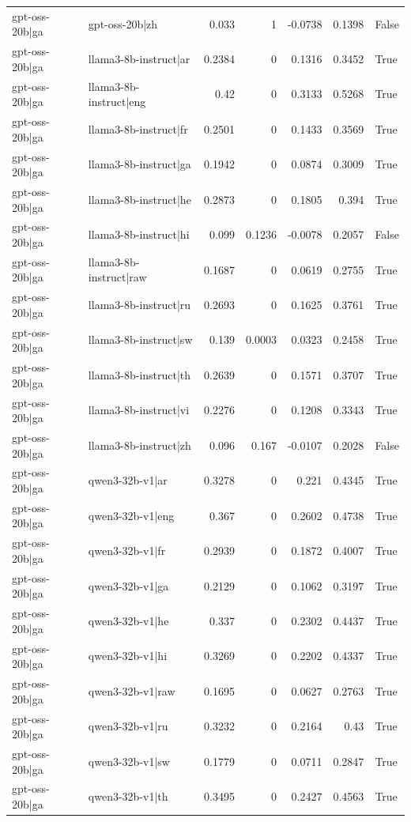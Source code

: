 \begin{table}
\begin{tabular}{l l r r r r l}
gpt-oss-20b|ga & gpt-oss-20b|zh & 0.033 & 1 & -0.0738 & 0.1398 & False \\
gpt-oss-20b|ga & llama3-8b-instruct|ar & 0.2384 & 0 & 0.1316 & 0.3452 & True \\
gpt-oss-20b|ga & llama3-8b-instruct|eng & 0.42 & 0 & 0.3133 & 0.5268 & True \\
gpt-oss-20b|ga & llama3-8b-instruct|fr & 0.2501 & 0 & 0.1433 & 0.3569 & True \\
gpt-oss-20b|ga & llama3-8b-instruct|ga & 0.1942 & 0 & 0.0874 & 0.3009 & True \\
gpt-oss-20b|ga & llama3-8b-instruct|he & 0.2873 & 0 & 0.1805 & 0.394 & True \\
gpt-oss-20b|ga & llama3-8b-instruct|hi & 0.099 & 0.1236 & -0.0078 & 0.2057 & False \\
gpt-oss-20b|ga & llama3-8b-instruct|raw & 0.1687 & 0 & 0.0619 & 0.2755 & True \\
gpt-oss-20b|ga & llama3-8b-instruct|ru & 0.2693 & 0 & 0.1625 & 0.3761 & True \\
gpt-oss-20b|ga & llama3-8b-instruct|sw & 0.139 & 0.0003 & 0.0323 & 0.2458 & True \\
gpt-oss-20b|ga & llama3-8b-instruct|th & 0.2639 & 0 & 0.1571 & 0.3707 & True \\
gpt-oss-20b|ga & llama3-8b-instruct|vi & 0.2276 & 0 & 0.1208 & 0.3343 & True \\
gpt-oss-20b|ga & llama3-8b-instruct|zh & 0.096 & 0.167 & -0.0107 & 0.2028 & False \\
gpt-oss-20b|ga & qwen3-32b-v1|ar & 0.3278 & 0 & 0.221 & 0.4345 & True \\
gpt-oss-20b|ga & qwen3-32b-v1|eng & 0.367 & 0 & 0.2602 & 0.4738 & True \\
gpt-oss-20b|ga & qwen3-32b-v1|fr & 0.2939 & 0 & 0.1872 & 0.4007 & True \\
gpt-oss-20b|ga & qwen3-32b-v1|ga & 0.2129 & 0 & 0.1062 & 0.3197 & True \\
gpt-oss-20b|ga & qwen3-32b-v1|he & 0.337 & 0 & 0.2302 & 0.4437 & True \\
gpt-oss-20b|ga & qwen3-32b-v1|hi & 0.3269 & 0 & 0.2202 & 0.4337 & True \\
gpt-oss-20b|ga & qwen3-32b-v1|raw & 0.1695 & 0 & 0.0627 & 0.2763 & True \\
gpt-oss-20b|ga & qwen3-32b-v1|ru & 0.3232 & 0 & 0.2164 & 0.43 & True \\
gpt-oss-20b|ga & qwen3-32b-v1|sw & 0.1779 & 0 & 0.0711 & 0.2847 & True \\
gpt-oss-20b|ga & qwen3-32b-v1|th & 0.3495 & 0 & 0.2427 & 0.4563 & True \\

\end{tabular}
\end{table}
